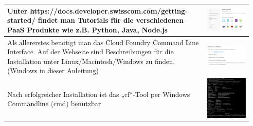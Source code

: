 \begin{longtable}{| p{5cm} | p{11cm} |}
\hline
Unter https://docs.developer.swisscom.com/getting-started/ 
findet man Tutorials für die verschiedenen PaaS Produkte wie z.B. Python, Java, Node.js
&\includegraphics[width=0.65\columnwidth, valign=T]{images/image1.png}\\ \hline
Als allererstes benötigt man das Cloud Foundry Command Line Interface. Auf der Webseite sind Beschreibungen für die Installation unter Linux/Macintosh/Windows zu finden. (Windows in dieser Anleitung) 
&\includegraphics[width=0.65\columnwidth, valign=T]{images/image2.png} \\ \hline
Nach erfolgreicher Installation ist das „cf“-Tool per Windows Commandline (cmd) benutzbar&\includegraphics[width=0.65\columnwidth, valign=T]{images/image3.png} \\ \hline

\end{longtable}
